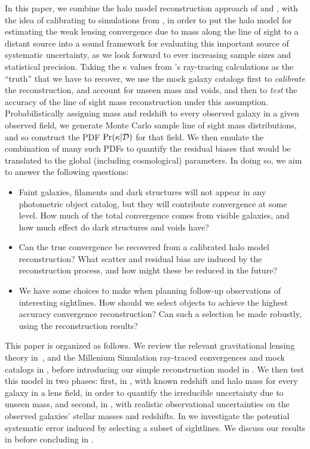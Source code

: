 \documentclass[useAMS,usenatbib]{mn2e}
\begin{document}
In this paper, we combine the halo model reconstruction approach of
\citeauthor{GunnarssonEtal2006} and \citeauthor{WongEtal2011}, with the
idea of calibrating to simulations from \citeauthor{SuyuEtal2010}, in
order to put the halo model for  estimating the weak lensing convergence
due to mass along the line of sight to a distant source into a sound
framework for evaluating this important source of systematic
uncertainty, as we look forward to ever increasing sample sizes and
statistical precision. Taking the $\kappa$ values from
\citeauthor{HilbertEtal2009}'s ray-tracing calculations as the ``truth''
that we have to recover, we use the \MS mock galaxy catalogs first to
{\it calibrate} the reconstruction, and account for unseen mass and
voids, and then to {\it test} the accuracy of the line of sight mass
reconstruction under this assumption. Probabilistically assigning mass
and redshift to every observed galaxy in a given observed field, we
generate Monte Carlo sample line of sight mass distributions, and so
construct the PDF $\Pr(\kappa|{\mathcal{D}})$ for that field. We then emulate
the combination of many such PDFs to quantify the residual biases that
would be translated to the global (including cosmological) parameters.
In doing so, we aim to answer the following questions: 

\begin{itemize}

\item Faint galaxies, filaments and dark structures will not appear in
any photometric object catalog, but they will contribute convergence at
some level. How much of the total convergence comes from visible
galaxies, and how much effect do dark structures and voids have? 

\item Can the true convergence be recovered from a calibrated halo model
reconstruction? What scatter and residual bias are induced by the
reconstruction process, and how might these be reduced in the future? 

\item We have some choices to make when planning follow-up observations
of interesting sightlines. How should we select objects to achieve the
highest accuracy convergence reconstruction? Can such a selection be
made robustly, using the reconstruction results?

\end{itemize}


This paper is organized as follows. We review the relevant gravitational
lensing theory in~, and the Millenium Simulation
ray-traced convergences and mock catalogs in , before
introducing our simple reconstruction  model in . We
then test this model in two phases: first, in , with
known redshift and halo mass for every galaxy in a lens field, in order
to quantify the irreducible uncertainty due to unseen mass, and second,
in , with realistic observational uncertainties on
the observed galaxies' stellar masses and redshifts. In
 we investigate the potential systematic error induced
by selecting a subset of sightlines. We discuss our results in
 before concluding in .
\end{document}

